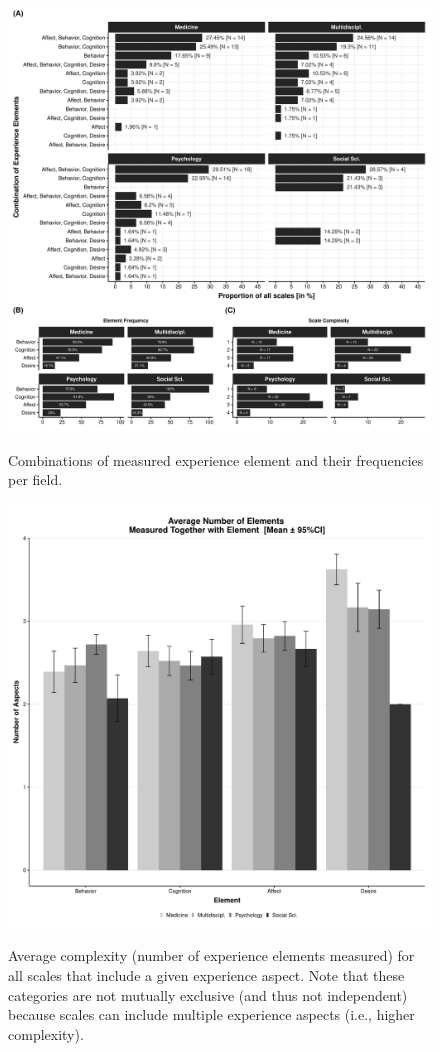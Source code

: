 \begin{figure}[h]
\centering
\caption{Combinations of measured experience element and their frequencies per field.}
\includegraphics[width=\textwidth]{Figures/FieldPlotFreq-1}
\label{fig:FieldPlotFreq}
\end{figure}

\begin{figure}[h]
\centering
\caption{Average complexity (number of experience elements measured) for all scales that include a given experience aspect. Note that these categories are not mutually exclusive (and thus not independent) because scales can include multiple experience aspects (i.e., higher complexity).}
\includegraphics[width=\textwidth]{Figures/FieldElementComp-1}
\label{fig:FieldElementComp}
\end{figure}

\vspace{1em}
